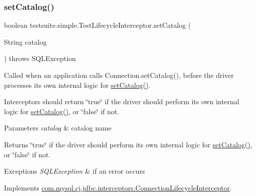 \subsubsection{\texorpdfstring{set\+Catalog()}{setCatalog()}}
{\footnotesize\ttfamily boolean testsuite.\+simple.\+Test\+Lifecycle\+Interceptor.\+set\+Catalog (\begin{DoxyParamCaption}\item[{String}]{catalog }\end{DoxyParamCaption}) throws S\+Q\+L\+Exception}

Called when an application calls Connection.\+set\+Catalog(), before the driver processes its own internal logic for \mbox{\hyperlink{classtestsuite_1_1simple_1_1_test_lifecycle_interceptor_accae42bd1b1d7a51fa35a6f375bf4ce4}{set\+Catalog()}}.

Interceptors should return \char`\"{}true\char`\"{} if the driver should perform its own internal logic for \mbox{\hyperlink{classtestsuite_1_1simple_1_1_test_lifecycle_interceptor_accae42bd1b1d7a51fa35a6f375bf4ce4}{set\+Catalog()}}, or \char`\"{}false\char`\"{} if not.


\begin{DoxyParams}{Parameters}
{\em catalog} & catalog name \\
\hline
\end{DoxyParams}
\begin{DoxyReturn}{Returns}
\char`\"{}true\char`\"{} if the driver should perform its own internal logic for \mbox{\hyperlink{classtestsuite_1_1simple_1_1_test_lifecycle_interceptor_accae42bd1b1d7a51fa35a6f375bf4ce4}{set\+Catalog()}}, or \char`\"{}false\char`\"{} if not.
\end{DoxyReturn}

\begin{DoxyExceptions}{Exceptions}
{\em S\+Q\+L\+Exception} & if an error occurs \\
\hline
\end{DoxyExceptions}


Implements \mbox{\hyperlink{interfacecom_1_1mysql_1_1cj_1_1jdbc_1_1interceptors_1_1_connection_lifecycle_interceptor_af094892c143ea900543d639bfaf1b258}{com.\+mysql.\+cj.\+jdbc.\+interceptors.\+Connection\+Lifecycle\+Interceptor}}.

\mbox{\label{classtestsuite_1_1simple_1_1_test_lifecycle_interceptor_a5ca18da030f4569891254990898f9c1b}} 
